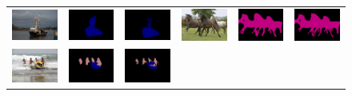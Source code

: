 \begin{figure}[!htbp]
{\begin{tabular}{c c c | c c c}
    \includegraphics[height=0.12\linewidth]{fig/img/2008_006229.jpg} &
    \includegraphics[height=0.12\linewidth]{fig/res_none/2008_006229.png} &
    \includegraphics[height=0.12\linewidth]{fig/res_crf/2008_006229.png} &
    \includegraphics[height=0.12\linewidth]{fig/img/2009_000412.jpg} &
    \includegraphics[height=0.12\linewidth]{fig/res_none/2009_000412.png} &
    \includegraphics[height=0.12\linewidth]{fig/res_crf/2009_000412.png} \\
    \includegraphics[height=0.12\linewidth]{fig/img/2009_000421.jpg} &
    \includegraphics[height=0.12\linewidth]{fig/res_none/2009_000421.png} &
    \includegraphics[height=0.12\linewidth]{fig/res_crf/2009_000421.png} &

\end{tabular}}
\end{figure}
